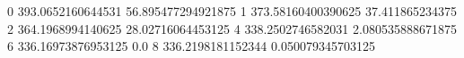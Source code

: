 0 393.0652160644531 56.895477294921875
1 373.58160400390625 37.411865234375
2 364.1968994140625 28.02716064453125
4 338.2502746582031 2.080535888671875
6 336.16973876953125 0.0
8 336.2198181152344 0.050079345703125
